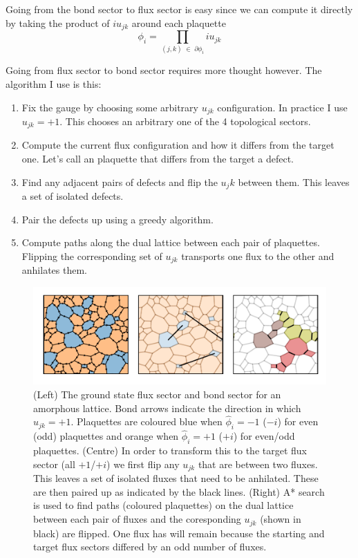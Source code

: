 Going from the bond sector to flux sector is easy since we can compute it directly by taking the product of \(i u_{jk}\) around each plaquette \[ \phi_i = \prod_{(j,k) \; \in \; \partial \phi_i} i u_{jk}\]

Going from flux sector to bond sector requires more thought however. The algorithm I use is this:

\begin{enumerate}
\def\labelenumi{\arabic{enumi}.}
\item
  Fix the gauge by choosing some arbitrary \(u_{jk}\) configuration. In practice I use \(u_{jk} = +1\). This chooses an arbitrary one of the 4 topological sectors.
\item
  Compute the current flux configuration and how it differs from the target one. Let's call an plaquette that differs from the target a defect.
\item
  Find any adjacent pairs of defects and flip the \(u_jk\) between them. This leaves a set of isolated defects.
\item
  Pair the defects up using a greedy algorithm.
\item
  Compute paths along the dual lattice between each pair of plaquettes. Flipping the corresponding set of \(u_{jk}\) transports one flux to the other and anhilates them.
\end{enumerate}

\begin{figure}
\hypertarget{fig:flux_finding}{%
\centering
\includegraphics[width=1\textwidth,height=\textheight]{figure_code/amk_chapter/flux_finding/flux_finding.pdf}
\caption{(Left) The ground state flux sector and bond sector for an amorphous lattice. Bond arrows indicate the direction in which \(u_{jk} = +1\). Plaquettes are coloured blue when \(\hat{\phi}_i = -1\) (\(-i\)) for even (odd) plaquettes and orange when \(\hat{\phi}_i = +1\) (\(+i\)) for even/odd plaquettes. (Centre) In order to transform this to the target flux sector (all \(+1\)/\(+i\)) we first flip any \(u_{jk}\) that are between two fluxes. This leaves a set of isolated fluxes that need to be anhilated. These are then paired up as indicated by the black lines. (Right) A* search is used to find paths (coloured plaquettes) on the dual lattice between each pair of fluxes and the coresponding \(u_{jk}\) (shown in black) are flipped. One flux has will remain because the starting and target flux sectors differed by an odd number of fluxes.}\label{fig:flux_finding}
}
\end{figure}

